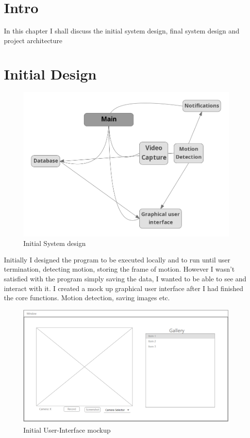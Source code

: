 \section{Intro}
In this chapter I shall discuss the initial system design, final system design and project architecture 
\section{Initial Design}
 \begin{figure}[!htbp] 
     \centering
     \includegraphics[scale=0.4]{img/initialDesign.png}
     \caption{Initial System design}
     \label{fig:my_label}
\end{figure}
Initially I designed the program to be executed locally and to run until user termination, detecting motion, storing the frame of motion. However I wasn't satisfied with the program simply saving the data, I wanted to be able to see and interact with it. I created a mock up graphical user interface after I had finished the core functions. Motion detection, saving images etc.
     \begin{figure}[!htbp] 
         \centering
         \includegraphics[scale=0.5]{img/InitialUI.PNG}
         \caption{Initial User-Interface mockup}
         \label{fig:my_label}
     \end{figure}    
